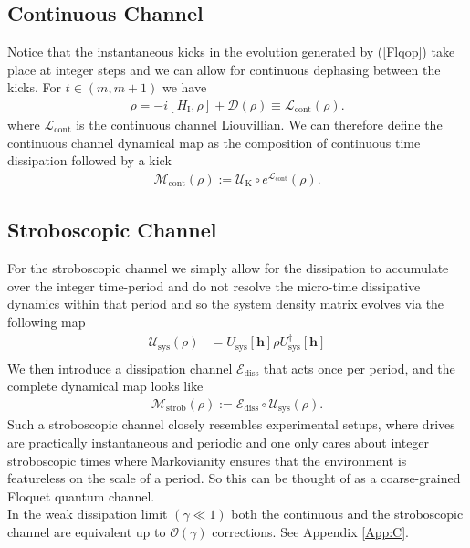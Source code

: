 \documentclass[aps,pra,reprint,amsmath,amssymb]{revtex4-2}
\newcommand{\UK}[0]{U_{\text{K}}}
\newcommand{\HK}[0]{H_{\text{K}}}
\begin{document}
\subsection{Continuous Channel}
Notice that the instantaneous kicks in the evolution generated by (\ref{Flqop}) take place at integer steps and we can allow for continuous dephasing between the kicks. For $t \in (m,m+1)$ we have 
\begin{align}
    \dot{\rho} = -i[H_\text{I}, \rho] + \mathcal{D}(\rho) \equiv \mathcal{L}_{\text{cont}}(\rho).
\end{align}
where $\mathcal{L}_{\text{cont}}$ is the continuous channel Liouvillian. We can therefore define the continuous channel dynamical map as the composition of continuous time dissipation followed by a kick 
\begin{align}
    \mathcal{M}_{\text{cont}}(\rho):=\mathcal{U}_\text{K} \circ e^{\mathcal{L}_{\text{cont}}}(\rho).
\end{align}
\subsection{Stroboscopic Channel}
For the stroboscopic channel we simply allow for the dissipation to accumulate over the integer time-period and do not resolve the micro-time dissipative dynamics within that period and so the system density matrix evolves via the following map
\begin{align}
    \mathcal{U}_{\text{sys}}(\rho)&= U_{\text{sys}}[\bm{h}] \rho U^\dagger_{\text{sys}}[\bm{h}] \nonumber\\
\end{align}
We then introduce a dissipation channel $\mathcal{E}_{\text{diss}}$ that acts once per period, and the complete dynamical map looks like
\begin{align}
\label{strobdynamics}
    \mathcal{M}_{\text{strob}}(\rho):=\mathcal{E
    }_{\text{diss}} \circ \mathcal{U}_{\text{sys}}(\rho).
\end{align}
Such a stroboscopic channel closely resembles experimental setups, where drives are practically instantaneous and periodic and one only cares about integer stroboscopic times where Markovianity ensures that the environment is featureless on the scale of a period. So this can be thought of as a coarse-grained Floquet quantum channel.
\\[4pt]
In the weak dissipation limit $(\gamma \ll 1)$ both the continuous and the stroboscopic channel are equivalent up to $\mathcal{O}(\gamma)$ corrections. See Appendix \ref{App:C}. 
\end{document}
